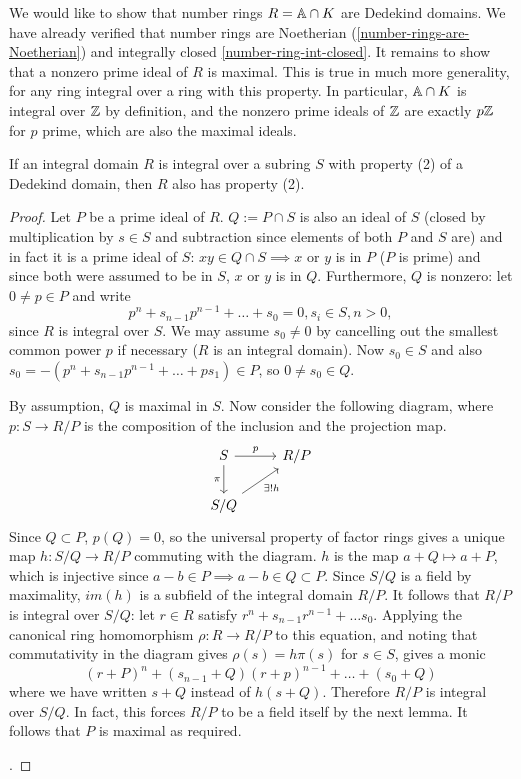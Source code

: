 We would like to show that number rings $R=\mathbb{A}\cap K$ are Dedekind domains.
We have already verified that number rings are Noetherian (\cref{number-rings-are-Noetherian}) and integrally closed \cref{number-ring-int-closed}. It remains to show that a nonzero prime ideal of $R$ is maximal.  This is true in much more generality, for any ring integral over a ring with this property. In particular, $\mathbb{A}\cap K$ is integral over $\mathbb{Z}$ by definition, and the nonzero prime ideals of $\mathbb{Z}$ are exactly $p\mathbb{Z}$ for $p$ prime, which are also the maximal ideals.

\begin{lemma}
If an integral domain $R$ is integral over a subring $S$ with property (2) of a Dedekind domain, then $R$ also has property (2).
\end{lemma}
\begin{proof}
Let $P$ be a prime ideal of $R$. $Q:=P\cap S$ is also an ideal of $S$ (closed by multiplication by $s\in S$ and subtraction since elements of both $P$ and $S$ are) and in fact it is a prime ideal of $S$: $xy\in Q\cap S\implies x$ or $y$ is in $P$ ($P$ is prime) and since both were assumed to be in $S$, $x$ or $y$ is in $Q.$ Furthermore, $Q$ is nonzero: let $0\neq p\in P$ and write $$p^n+s_{n-1}p^{n-1}+\dots +s_{0}=0, s_i\in S, n>0,$$ since $R$ is integral over $S$. We may assume $s_0\neq 0$ by cancelling out the smallest common power $p$ if necessary ($R$ is an integral domain). 
Now  $s_0\in S$ and also $s_0=-(p^n+s_{n-1}p^{n-1}+\dots+ps_1)\in P$, so $0\neq s_0\in Q.$

By assumption, $Q$ is maximal in $S$. Now consider the following diagram, where $p:S\rightarrow R/P$ is the composition of the inclusion and the projection map.
\[\begin{tikzcd}
S \arrow[d, "\pi"'] \arrow[r, "p"] & R/P \\
S/Q \arrow[ru, "\exists! h"']      &    
\end{tikzcd}\]
Since $Q\subset P$, $p(Q)=0$, so the universal property of factor rings gives a unique map $h:S/Q\rightarrow R/P$ commuting with the diagram. $h$ is the map $a+Q\mapsto a+P$, which is injective since $a-b\in P\implies a-b\in Q\subset P$. Since $S/Q$ is a field by maximality, $im(h)$ is a subfield of the integral domain $R/P.$ It follows that $R/P$ is integral over $S/Q$: let $r\in R$ satisfy $r^n+s_{n-1}r^{n-1}+\dots s_0$. Applying the canonical ring homomorphism $\rho:R\rightarrow R/P$ to this equation, and noting that commutativity in the diagram gives $\rho(s)=h\pi(s)$ for $s\in S$, gives a monic
$$(r+P)^n+(s_{n-1}+Q)(r+p)^{n-1}+\dots+(s_0 +Q)$$
where we have written $s+Q$ instead of $h(s+Q)$. Therefore $R/P$ is integral over $S/Q.$ In fact, this forces $R/P$ to be a field itself by the next lemma. It follows that $P$ is maximal as required.

\cite{Wright}.\end{proof}

